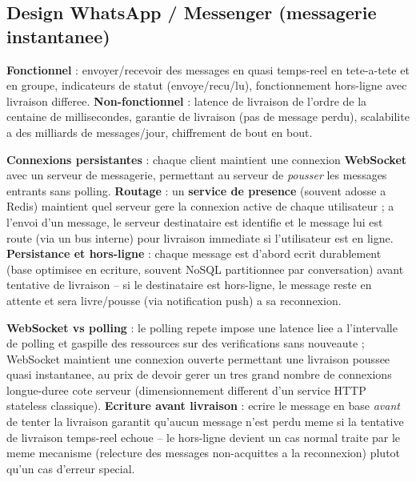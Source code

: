 \documentclass[11pt,a4paper]{article}
\newenvironment{sujet}[1]{%
  \subsection{#1}
}{%
  \bigskip
}
\begin{document}
\begin{sujet}{Design WhatsApp / Messenger (messagerie instantanee)}

\begin{req}
\textbf{Fonctionnel} : envoyer/recevoir des messages en quasi temps-reel en tete-a-tete et en groupe, indicateurs de statut (envoye/recu/lu), fonctionnement hors-ligne avec livraison differee. \textbf{Non-fonctionnel} : latence de livraison de l'ordre de la centaine de millisecondes, garantie de livraison (pas de message perdu), scalabilite a des milliards de messages/jour, chiffrement de bout en bout.
\end{req}

\begin{archbox}
\textbf{Connexions persistantes} : chaque client maintient une connexion \textbf{WebSocket} avec un serveur de messagerie, permettant au serveur de \emph{pousser} les messages entrants sans polling. \textbf{Routage} : un \textbf{service de presence} (souvent adosse a Redis) maintient quel serveur gere la connexion active de chaque utilisateur ; a l'envoi d'un message, le serveur destinataire est identifie et le message lui est route (via un bus interne) pour livraison immediate si l'utilisateur est en ligne. \textbf{Persistance et hors-ligne} : chaque message est d'abord ecrit durablement (base optimisee en ecriture, souvent NoSQL partitionnee par conversation) avant tentative de livraison -- si le destinataire est hors-ligne, le message reste en attente et sera livre/pousse (via notification push) a sa reconnexion.
\end{archbox}

\begin{tradeoff}
\textbf{WebSocket vs polling} : le polling repete impose une latence liee a l'intervalle de polling et gaspille des ressources sur des verifications sans nouveaute ; WebSocket maintient une connexion ouverte permettant une livraison poussee quasi instantanee, au prix de devoir gerer un tres grand nombre de connexions longue-duree cote serveur (dimensionnement different d'un service HTTP stateless classique). \textbf{Ecriture avant livraison} : ecrire le message en base \emph{avant} de tenter la livraison garantit qu'aucun message n'est perdu meme si la tentative de livraison temps-reel echoue -- le hors-ligne devient un cas normal traite par le meme mecanisme (relecture des messages non-acquittes a la reconnexion) plutot qu'un cas d'erreur special.
\end{tradeoff}

\end{sujet}
\end{document}
